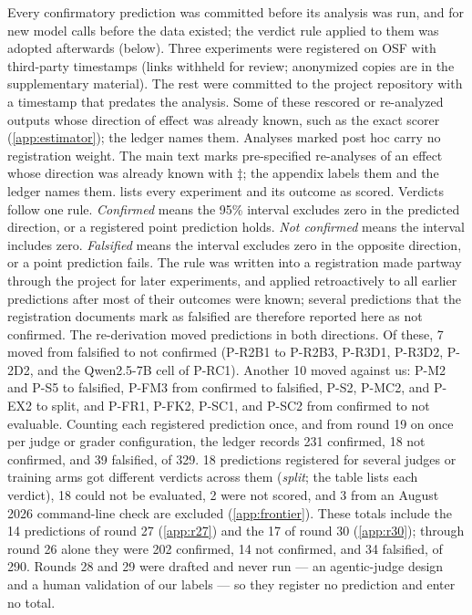 Every confirmatory prediction was committed before its analysis was run, and for new model calls before the data existed; the verdict rule applied to them was adopted afterwards (below). Three experiments were registered on OSF with third-party timestamps\osf{} (links withheld for review; anonymized copies are in the supplementary material). The rest were committed to the project repository with a timestamp that predates the analysis\pre. Some of these rescored or re-analyzed outputs whose direction of effect was already known, such as the exact scorer (\cref{app:estimator}); the ledger names them. Analyses marked post hoc\ph{} carry no registration weight. The main text marks pre-specified re-analyses of an effect whose direction was already known with $\ddagger$; the appendix labels them \pre{} and the ledger names them.  lists every experiment and its outcome as scored. Verdicts follow one rule. \emph{Confirmed} means the 95\% interval excludes zero in the predicted direction, or a registered point prediction holds. \emph{Not confirmed} means the interval includes zero. \emph{Falsified} means the interval excludes zero in the opposite direction, or a point prediction fails. The rule was written into a registration made partway through the project for later experiments, and applied retroactively to all earlier predictions after most of their outcomes were known; several predictions that the registration documents mark as falsified are therefore reported here as not confirmed. The re-derivation moved predictions in both directions. Of these, 7 moved from falsified to not confirmed (P-R2B1 to P-R2B3, P-R3D1, P-R3D2, P-2D2, and the Qwen2.5-7B cell of P-RC1). Another 10 moved against us: P-M2 and P-S5 to falsified, P-FM3 from confirmed to falsified, P-S2, P-MC2, and P-EX2 to split, and P-FR1, P-FK2, P-SC1, and P-SC2 from confirmed to not evaluable. Counting each registered prediction once, and from round 19 on once per judge or grader configuration, the ledger records 231 confirmed, 18 not confirmed, and 39 falsified, of 329. 18 predictions registered for several judges or training arms got different verdicts across them (\emph{split}; the table lists each verdict), 18 could not be evaluated, 2 were not scored, and 3 from an August 2026 command-line check are excluded (\cref{app:frontier}). These totals include the 14 predictions of round 27 (\cref{app:r27}) and the 17 of round 30 (\cref{app:r30}); through round 26 alone they were 202 confirmed, 14 not confirmed, and 34 falsified, of 290. Rounds 28 and 29 were drafted and never run --- an agentic-judge design and a human validation of our labels --- so they register no prediction and enter no total.

